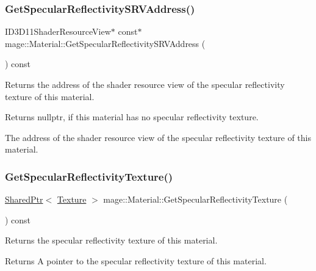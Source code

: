 \subsubsection{\texorpdfstring{Get\+Specular\+Reflectivity\+S\+R\+V\+Address()}{GetSpecularReflectivitySRVAddress()}}
{\footnotesize\ttfamily I\+D3\+D11\+Shader\+Resource\+View$\ast$ const$\ast$ mage\+::\+Material\+::\+Get\+Specular\+Reflectivity\+S\+R\+V\+Address (\begin{DoxyParamCaption}{ }\end{DoxyParamCaption}) const\hspace{0.3cm}{\ttfamily [noexcept]}}

Returns the address of the shader resource view of the specular reflectivity texture of this material.

\begin{DoxyReturn}{Returns}
{\ttfamily nullptr}, if this material has no specular reflectivity texture. 

The address of the shader resource view of the specular reflectivity texture of this material. 
\end{DoxyReturn}
\hypertarget{structmage_1_1_material_a7ed5469af2440a4fc1db498c24f06764}{}\label{structmage_1_1_material_a7ed5469af2440a4fc1db498c24f06764} 
\subsubsection{\texorpdfstring{Get\+Specular\+Reflectivity\+Texture()}{GetSpecularReflectivityTexture()}}
{\footnotesize\ttfamily \hyperlink{namespacemage_a1e01ae66713838a7a67d30e44c67703e}{Shared\+Ptr}$<$ \hyperlink{classmage_1_1_texture}{Texture} $>$ mage\+::\+Material\+::\+Get\+Specular\+Reflectivity\+Texture (\begin{DoxyParamCaption}{ }\end{DoxyParamCaption}) const\hspace{0.3cm}{\ttfamily [noexcept]}}

Returns the specular reflectivity texture of this material.

\begin{DoxyReturn}{Returns}
A pointer to the specular reflectivity texture of this material. 
\end{DoxyReturn}
\hypertarget{structmage_1_1_material_aba949cb74176530638c7bcb100882196}{}\label{structmage_1_1_material_aba949cb74176530638c7bcb100882196} 
